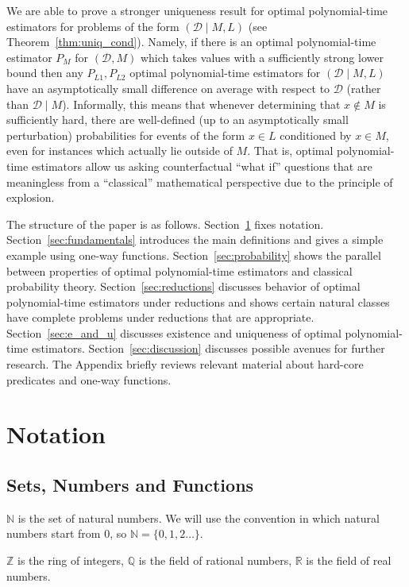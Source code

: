 \documentclass{article}
\numberwithin{equation}{section}
\theoremstyle{definition}
\theoremstyle{plain}
\newcommand{\Nats}{\mathbb{N}}
\newcommand{\Ints}{\mathbb{Z}}
\newcommand{\Rats}{\mathbb{Q}}
\newcommand{\Reals}{\mathbb{R}}
\newcommand{\Dist}{\mathcal{D}}
\begin{document}
We are able to prove a stronger uniqueness result for optimal polynomial-time estimators for problems of the form ${(\Dist \mid M, L)}$ (see Theorem~\ref{thm:uniq_cond}). Namely, if there is an optimal polynomial-time estimator ${P_M}$ for ${(\Dist,M)}$ which takes values with a sufficiently strong lower bound then any ${P_{L1},P_{L2}}$ optimal polynomial-time estimators for ${(\Dist \mid M, L)}$ have an asymptotically small difference on average with respect to ${\Dist}$ (rather than ${\Dist \mid M}$). Informally, this means that whenever determining that ${x \not\in M}$ is sufficiently hard, there are well-defined (up to an asymptotically small perturbation) probabilities for events of the form ${x \in L}$ conditioned by ${x \in M}$, even for instances which actually lie outside of ${M}$. That is, optimal polynomial-time estimators allow us asking counterfactual \enquote{what if} questions that are meaningless from a \enquote{classical} mathematical perspective due to the principle of explosion.

The structure of the paper is as follows. Section~\ref{sec:notation} fixes notation. Section~\ref{sec:fundamentals} introduces the main definitions and gives a simple example using one-way functions. Section~\ref{sec:probability} shows the parallel between properties of optimal polynomial-time estimators and classical probability theory. Section~\ref{sec:reductions} discusses behavior of optimal polynomial-time estimators under reductions and shows certain natural classes have complete problems under reductions that are appropriate. Section~\ref{sec:e_and_u} discusses existence and uniqueness of optimal polynomial-time estimators. Section~\ref{sec:discussion} discusses possible avenues for further research. The Appendix briefly reviews relevant material about hard-core predicates and one-way functions.

\section{Notation}
\label{sec:notation}
%
\subsection{Sets, Numbers and Functions}

$\Nats$ is the set of natural numbers. We will use the convention in which natural numbers start from 0, so $\Nats = \{0, 1, 2 \ldots \}$. 

$\Ints$ is the ring of integers, $\Rats$ is the field of rational numbers, $\Reals$ is the field of real numbers.
\end{document}
